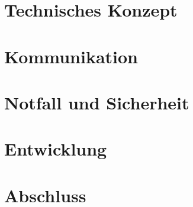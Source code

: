 \section{Technisches Konzept}
\section{Kommunikation}
\section{Notfall und Sicherheit}
\section{Entwicklung}
\section{Abschluss}
